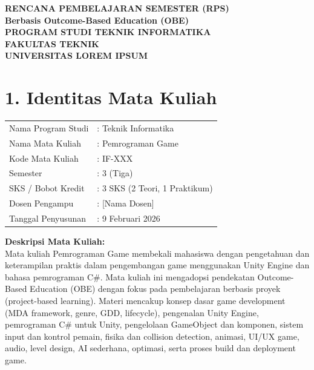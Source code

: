 \documentclass[12pt,a4paper]{article}
\begin{document}
\begin{center}
\textbf{\Large RENCANA PEMBELAJARAN SEMESTER (RPS)}\\
\textbf{Berbasis Outcome-Based Education (OBE)}\\[0.5cm]
\textbf{PROGRAM STUDI TEKNIK INFORMATIKA}\\
\textbf{FAKULTAS TEKNIK}\\
\textbf{UNIVERSITAS LOREM IPSUM}\\
\end{center}

\vspace{1cm}

\section*{1. Identitas Mata Kuliah}
\begin{tabular}{ll}
Nama Program Studi & : Teknik Informatika \\
Nama Mata Kuliah & : Pemrograman Game \\
Kode Mata Kuliah & : IF-XXX \\
Semester & : 3 (Tiga) \\
SKS / Bobot Kredit & : 3 SKS (2 Teori, 1 Praktikum) \\
Dosen Pengampu & : [Nama Dosen] \\
Tanggal Penyusunan & : 9 Februari 2026 \\
\end{tabular}

\textbf{Deskripsi Mata Kuliah:}\\
Mata kuliah Pemrograman Game membekali mahasiswa dengan pengetahuan dan keterampilan praktis dalam pengembangan game menggunakan Unity Engine dan bahasa pemrograman C\#. Mata kuliah ini mengadopsi pendekatan Outcome-Based Education (OBE) dengan fokus pada pembelajaran berbasis proyek (project-based learning). Materi mencakup konsep dasar game development (MDA framework, genre, GDD, lifecycle), pengenalan Unity Engine, pemrograman C\# untuk Unity, pengelolaan GameObject dan komponen, sistem input dan kontrol pemain, fisika dan collision detection, animasi, UI/UX game, audio, level design, AI sederhana, optimasi, serta proses build dan deployment game.

\vspace{0.5cm}

\end{document}
